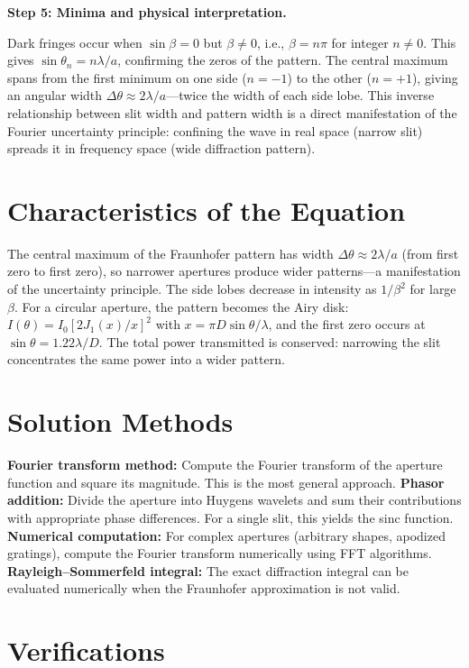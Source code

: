 \textbf{Step 5: Minima and physical interpretation.}

Dark fringes occur when $\sin\beta = 0$ but $\beta \neq 0$, i.e., $\beta = n\pi$ for integer $n \neq 0$. This gives $\sin\theta_n = n\lambda/a$, confirming the zeros of the pattern. The central maximum spans from the first minimum on one side ($n = -1$) to the other ($n = +1$), giving an angular width $\Delta\theta \approx 2\lambda/a$---twice the width of each side lobe. This inverse relationship between slit width and pattern width is a direct manifestation of the Fourier uncertainty principle: confining the wave in real space (narrow slit) spreads it in frequency space (wide diffraction pattern).

\section*{Characteristics of the Equation}

The central maximum of the Fraunhofer pattern has width $\Delta\theta \approx 2\lambda/a$ (from first zero to first zero), so narrower apertures produce wider patterns---a manifestation of the uncertainty principle. The side lobes decrease in intensity as $1/\beta^2$ for large $\beta$. For a circular aperture, the pattern becomes the Airy disk: $I(\theta) = I_0\left[2J_1(x)/x\right]^2$ with $x = \pi D \sin\theta/\lambda$, and the first zero occurs at $\sin\theta = 1.22\lambda/D$. The total power transmitted is conserved: narrowing the slit concentrates the same power into a wider pattern.
\section*{Solution Methods}

\textbf{Fourier transform method:} Compute the Fourier transform of the aperture function and square its magnitude. This is the most general approach. \textbf{Phasor addition:} Divide the aperture into Huygens wavelets and sum their contributions with appropriate phase differences. For a single slit, this yields the sinc function. \textbf{Numerical computation:} For complex apertures (arbitrary shapes, apodized gratings), compute the Fourier transform numerically using FFT algorithms. \textbf{Rayleigh--Sommerfeld integral:} The exact diffraction integral can be evaluated numerically when the Fraunhofer approximation is not valid.
\section*{Verifications}

